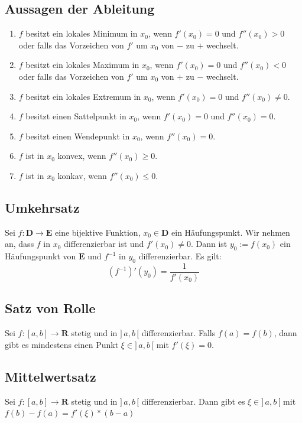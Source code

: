 \documentclass[8pt]{article}
\begin{document}
\begin{multicols*}{3}
\subsection{Aussagen der Ableitung}
\begin{enumerate}
  \item $f$ besitzt ein lokales Minimum in $x_0$, wenn $f'(x_0) = 0$ und $f''(x_0) > 0$ oder falls das Vorzeichen von $f'$ um $x_0$ von $-$ zu $+$ wechselt.
  \item $f$ besitzt ein lokales Maximum in $x_0$, wenn $f'(x_0) = 0$ und $f''(x_0) < 0$ oder falls das Vorzeichen von $f'$ um $x_0$ von $+$ zu $-$ wechselt.
  \item $f$ besitzt ein lokales Extremum in $x_0$, wenn $f'(x_0) = 0$ und $f''(x_0) \ne 0$.
  \item $f$ besitzt einen Sattelpunkt in $x_0$, wenn $f'(x_0) = 0$ und $f''(x_0) = 0$.
  \item $f$ besitzt einen Wendepunkt in $x_0$, wenn $f''(x_0) = 0$.
  \item $f$ ist in $x_0$ konvex, wenn $f''(x_0) \ge 0$.
  \item $f$ ist in $x_0$ konkav, wenn $f''(x_0) \le 0$.
\end{enumerate}
\subsection{Umkehrsatz}

Sei $f: \mathbf{D} \rightarrow \mathbf{E}$ eine bijektive Funktion,
$x_0 \in \mathbf{D}$ ein Häufungspunkt. Wir
nehmen an, dass $f$ in $x_0$ differenzierbar ist und $f'(x_0) \neq 0$.
Dann ist $y_0 := f(x_0)$ ein Häufungspunkt von $\mathbf{E}$
und $f^{-1}$ in $y_0$ differenzierbar. Es gilt:
$$
  (f^{-1})'(y_0) = \frac{1}{f'(x_0)}
$$

\subsection{Satz von Rolle}

Sei $f:[a, b] \rightarrow \mathbf{R}$ stetig und in $]\,a, b\,[$ differenzierbar. Falls
$f(a) = f(b)$, dann gibt es mindestens einen Punkt $\xi \in ]\,a, b\,[$ mit $f'(\xi) = 0$.

\subsection{Mittelwertsatz}

Sei $f:[a, b] \rightarrow \mathbf{R}$ stetig und in $]\,a, b\,[$ differenzierbar. Dann
gibt es $\xi \in ]\,a, b\,[$ mit $f(b) - f(a) = f'(\xi) * (b-a)$


\end{multicols*}
\end{document}
